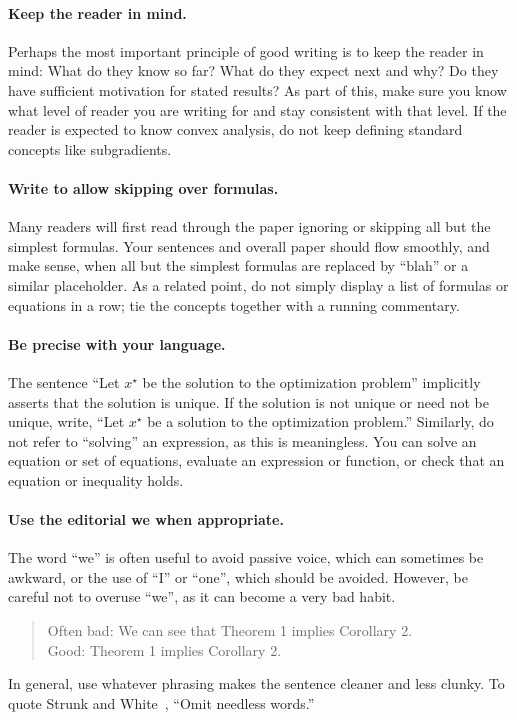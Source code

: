 \documentclass{article}
\begin{document}
\paragraph{Keep the reader in mind.} 
Perhaps the most important principle of good writing is to keep the reader in mind: 
What do they know so far? 
What do they expect next and why? 
Do they have sufficient motivation for stated results? 
As part of this, make sure you know what level of reader you are writing for and stay consistent with that level. 
If the reader is expected to know convex analysis, do not keep defining standard concepts like subgradients.

\paragraph{Write to allow skipping over formulas.}
Many readers will first read through the paper ignoring or skipping all but the simplest formulas. 
Your sentences and overall paper should flow smoothly, and make sense, when all but the simplest formulas are replaced by ``blah'' or a similar placeholder. 
As a related point, do not simply display a list of formulas or equations in a row; tie the concepts together with a running commentary.

\paragraph{Be precise with your language.}
The sentence ``Let $x^\star$ be the solution to the optimization problem'' implicitly asserts that the solution is unique. 
If the solution is not unique or need not be unique, write, ``Let $x^\star$ be a solution to the optimization problem.'' 
Similarly, do not refer to ``solving'' an expression, as this is meaningless. 
You can solve an equation or set of equations, evaluate an expression or function, or check that an equation or inequality holds.

\paragraph{Use the editorial we when appropriate.}
The word ``we'' is often useful to avoid passive voice, which can sometimes be awkward, or the use of ``I'' or ``one'', which should be avoided. 
However, be careful not to overuse ``we'', as it can become a very bad habit.
\begin{quote}
    Often bad: We can see that Theorem 1 implies Corollary 2.\\
    Good: Theorem 1 implies Corollary 2.
\end{quote}
In general, use whatever phrasing makes the sentence cleaner and less clunky.
To quote Strunk and White~\cite{SW:59}, ``Omit needless words.''
\end{document}
